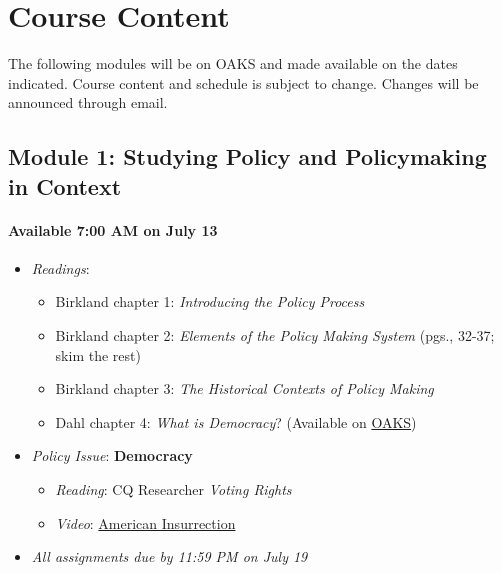 \hypertarget{course-content}{%
\section{Course Content}\label{course-content}}

The following modules will be on OAKS and made available on the dates
indicated. Course content and schedule is subject to change. Changes
will be announced through email.

\hypertarget{module-1-studying-policy-and-policymaking-in-context}{%
\subsection{Module 1: Studying Policy and Policymaking in
Context}\label{module-1-studying-policy-and-policymaking-in-context}}

\hypertarget{available-700-am-on-july-13}{%
\paragraph{Available 7:00 AM on July
13}\label{available-700-am-on-july-13}}

\begin{itemize}

\item
  \emph{Readings}:

  \begin{itemize}
  
  \item
    Birkland chapter 1: \emph{Introducing the Policy Process}
  \item
    Birkland chapter 2: \emph{Elements of the Policy Making System}
    (pgs., 32-37; skim the rest)
  \item
    Birkland chapter 3: \emph{The Historical Contexts of Policy Making}
  \item
    Dahl chapter 4: \emph{What is Democracy}? (Available on
    \href{https://lms.cofc.edu/d2l/home}{OAKS})
  \end{itemize}
\item
  \emph{Policy Issue}: \textbf{Democracy}

  \begin{itemize}
  
  \item
    \emph{Reading}: CQ Researcher \emph{Voting Rights}
  \item
    \emph{Video}:
    \href{https://www.pbs.org/wgbh/frontline/film/american-insurrection/}{American
    Insurrection}
  \end{itemize}
\item
  \emph{All assignments due by 11:59 PM on July 19}
\end{itemize}


